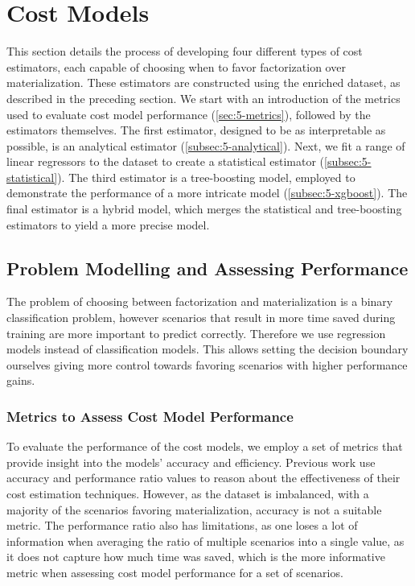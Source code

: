 \section{Cost Models}
\label{sec:5-cost-models}
This section details the process of developing four different types of cost estimators, each capable of choosing when to favor factorization over materialization. These estimators are constructed using the enriched dataset, as described in the preceding section. We start with an introduction of the metrics used to evaluate cost model performance (\autoref{sec:5-metrics}), followed by the estimators themselves. The first estimator, designed to be as interpretable as possible, is an analytical estimator (\autoref{subsec:5-analytical}). Next, we fit a range of linear regressors to the dataset to create a statistical estimator (\autoref{subsec:5-statistical}). The third estimator is a tree-boosting model, employed to demonstrate the performance of a more intricate model (\autoref{subsec:5-xgboost}). The final estimator is a hybrid model, which merges the statistical and tree-boosting estimators to yield a more precise model.

\subsection{Problem Modelling and Assessing Performance}
\label{sec:5-metrics}
The problem of choosing between factorization and materialization is a binary classification problem, however scenarios that result in more time saved during training are more important to predict correctly. Therefore we use regression models instead of classification models. This allows setting the decision boundary ourselves giving more control towards favoring scenarios with higher performance gains.

\subsubsection{Metrics to Assess Cost Model Performance}
To evaluate the performance of the cost models, we employ a set of metrics that provide insight into the models' accuracy and efficiency. Previous work \cite{schijndel_cost_estimation,orion_learning_gen_lin_models,MorpheusFI} use accuracy and performance ratio values to reason about the effectiveness of their cost estimation techniques. However, as the dataset is imbalanced, with a majority of the scenarios favoring materialization, accuracy is not a suitable metric. The performance ratio also has limitations, as one loses a lot of information when averaging the ratio of multiple scenarios into a single value, as it does not capture how much time was saved, which is the more informative metric when assessing cost model performance for a set of scenarios.

